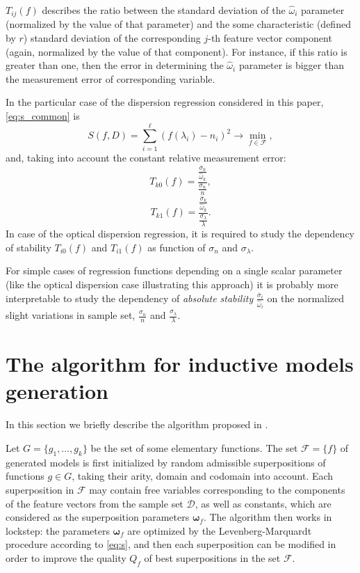 \documentclass[11pt,a4paper]{article}
\theoremstyle{definition}
\begin{document}
$T_{ij}(f)$ describes the ratio between the standard deviation of the $\hat{\omega}_i$ parameter
(normalized by the value of that parameter) and the some characteristic (defined by $r$)
standard deviation of the corresponding $j$-th feature vector component (again, normalized by
the value of that component).
For instance, if this ratio is greater than one, then the error in determining the $\hat{\omega}_i$
parameter is bigger than the measurement error of corresponding variable.

In the particular case of the dispersion regression considered in this paper, \eqref{eq:s_common}
is
\begin{equation}
  S(f, D) = \sum_{i = 1}^\ell (f(\lambda_i) - n_i)^2 \rightarrow \min_{f \in \mathcal{F}},
  \label{eq:s}
\end{equation}
and, taking into account the constant relative measurement error:
\[
  T_{k0}(f) = \frac{\frac{\overline{\sigma}_k}{\hat{\omega}_k}}{\frac{\sigma_n}{n}},
\]
\[
  T_{k1}(f) = \frac{\frac{\overline{\sigma}_k}{\hat{\omega}_k}}{\frac{\sigma_{\lambda}}{\lambda}}.
\]
In case of the optical dispersion regression, it is required to study the dependency of stability
$T_{i0}(f)$ and $T_{i1}(f)$ as function of $\sigma_n$ and $\sigma_{\lambda}$.

For simple cases of regression functions depending on a single scalar parameter (like the optical
dispersion case illustrating this approach) it is probably more interpretable to study the
dependency of \emph{absolute stability} $\frac{\overline{\sigma}_i}{\hat{\omega}_i}$ on the
normalized slight variations in sample set, $\frac{\sigma_n}{n}$ and $\frac{\sigma_{\lambda}}{\lambda}$.

\section{The algorithm for inductive models generation}

In this section we briefly describe the algorithm proposed in \citep{Rudoy13}.

Let $G = \{ g_1, \dots, g_k \}$ be the set of some elementary functions.
The set $\mathcal{F} = \{ f \}$ of generated models is first initialized
by random admissible superpositions of functions $g \in G$, taking their
arity, domain and codomain into account. Each superposition in $\mathcal{F}$
may contain free variables corresponding to the components of the feature
vectors from the sample set $\mathcal{D}$, as well as constants, which are
considered as the superposition parameters $\boldsymbol{\omega}_f$.
The algorithm then works in lockstep: the parameters $\boldsymbol{\omega}_f$
are optimized by the Levenberg-Marquardt procedure according to
\eqref{eq:s}, and then each superposition can be modified
in order to improve the quality $Q_f$ of best superpositions
in the set $\mathcal{F}$.
\end{document}
